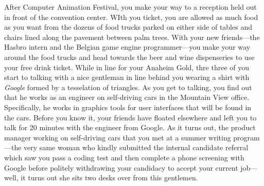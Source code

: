 \documentclass[../main.tex]{subfiles}
\begin{document}
After Computer Animation Festival, you make your way to a reception held out in front of the convention center. WIth you ticket, you are allowed as much food as you want from the dozens of food trucks parked on either side of tables and chairs lined along the pavement between palm trees. With your new friends---the Hasbro intern and the Belgian game engine programmer---you make your way around the food trucks and head towards the beer and wine dispenseries to use your free drink ticket. While in line for your Anaheim Gold, thre three of you start to talking with a nice gentleman in line behind you wearing a shirt with \textit{Google} formed by a tesselation of triangles. As you get to talking, you find out that he works as an engineer on self-driving cars in the Mountain View office. Specifically, he works in graphics tools for user interfaces that will be found in the cars. Before you know it, your friends have floated elsewhere and left you to talk for 20 minutes with the engineer from Google. As it turns out, the product manager working on self-driving cars that you met at a summer writing program---the very same woman who kindly submitted the internal candidate referral which saw you pass a coding test and then complete a phone screening with Google before politely withdrawing your candidacy to accept your current job---well, it turns out she sits two desks over from this gentlemen. 
\end{document}
